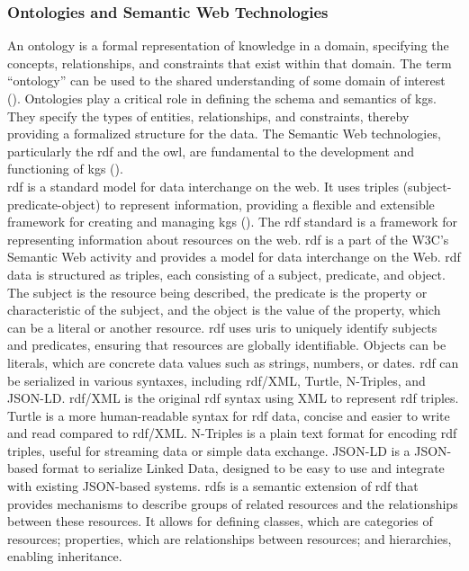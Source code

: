 \subsubsection*{Ontologies and Semantic Web Technologies}
An ontology is a formal representation of knowledge in a domain, specifying the concepts, relationships, and constraints that exist within that domain. The term ``ontology'' can be used to the shared understanding of some domain of interest (\cite{Uschold1996}).
Ontologies play a critical role in defining the schema and semantics of \glspl{kg}. They specify the types of entities, relationships, and constraints, thereby providing a formalized structure for the data. The Semantic Web technologies, particularly the \gls{rdf} and the \gls{owl}, are fundamental to the development and functioning of \glspl{kg} (\cite{Antoniou2008}).
\\\gls{rdf} is a standard model for data interchange on the web. It uses triples (subject-predicate-object) to represent information, providing a flexible and extensible framework for creating and managing \glspl{kg} (\cite{Cyganiak14RCA}).
The \gls{rdf} standard is a framework for representing information about resources on the web. \gls{rdf} is a part of the W3C's Semantic Web activity and provides a model for data interchange on the Web. \gls{rdf} data is structured as triples, each consisting of a subject, predicate, and object. The subject is the resource being described, the predicate is the property or characteristic of the subject, and the object is the value of the property, which can be a literal or another resource.
\gls{rdf} uses \glspl{uri} to uniquely identify subjects and predicates, ensuring that resources are globally identifiable. Objects can be literals, which are concrete data values such as strings, numbers, or dates.
\gls{rdf} can be serialized in various syntaxes, including \gls{rdf}/XML, Turtle, N-Triples, and JSON-LD. \gls{rdf}/XML is the original \gls{rdf} syntax using XML to represent \gls{rdf} triples. Turtle is a more human-readable syntax for \gls{rdf} data, concise and easier to write and read compared to \gls{rdf}/XML. N-Triples is a plain text format for encoding \gls{rdf} triples, useful for streaming data or simple data exchange. JSON-LD is a JSON-based format to serialize Linked Data, designed to be easy to use and integrate with existing JSON-based systems.
\gls{rdfs} is a semantic extension of \gls{rdf} that provides mechanisms to describe groups of related resources and the relationships between these resources. It allows for defining classes, which are categories of resources; properties, which are relationships between resources; and hierarchies, enabling inheritance.
